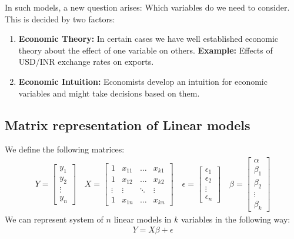 \documentclass[notoc]{tufte-book}
\begin{document}
In such models, a new question arises: Which variables do we need to consider. This is decided by two factors:
\begin{enumerate}
    \item \textbf{Economic Theory: }In certain cases we have well established economic theory about the effect of one variable on others. \textbf{Example: }Effects of USD/INR exchange rates on exports.
    \item \textbf{Economic Intuition: }Economists develop an intuition for economic variables and might take decisions based on them.
\end{enumerate}

\subsection{Matrix representation of Linear models}
We define the following matrices:
\begin{align*}
    Y=\begin{bmatrix}y_1\\y_2\\\vdots\\y_n\end{bmatrix}\quad X=\begin{bmatrix}
        1&x_{11}&\hdots&x_{k1}\\
        1&x_{12}&\hdots&x_{k2}\\
        \vdots&\vdots&\ddots&\vdots\\
        1&x_{1n}&\hdots&x_{kn}
    \end{bmatrix}\quad 
    \epsilon=\begin{bmatrix}\epsilon_1\\\epsilon_2\\\vdots\\\epsilon_n\end{bmatrix}\quad
    \beta=\begin{bmatrix}\alpha\\\beta_1\\\beta_2\\\vdots\\\beta_k\end{bmatrix}
\end{align*}
We can represent system of $n$ linear models in $k$ variables in the following way:
\begin{align}
    Y=X\beta+\epsilon
\end{align}
\end{document}

